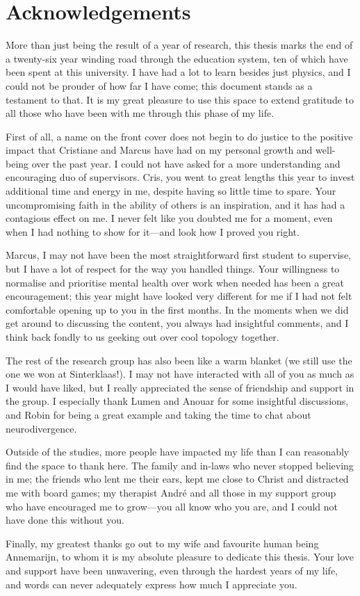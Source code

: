 \chapter*{Acknowledgements}

More than just being the result of a year of research, this thesis marks the end of a twenty-six year winding road through the education system, ten of which have been spent at this university. I have had a lot to learn besides just physics, and I could not be prouder of how far I have come; this document stands as a testament to that. It is my great pleasure to use this space to extend gratitude to all those who have been with me through this phase of my life.

First of all, a name on the front cover does not begin to do justice to the positive impact that Cristiane and Marcus have had on my personal growth and well-being over the past year. I could not have asked for a more understanding and encouraging duo of supervisors. Cris, you went to great lengths this year to invest additional time and energy in me, despite having so little time to spare. Your uncompromising faith in the ability of others is an inspiration, and it has had a contagious effect on me. I never felt like you doubted me for a moment, even when I had nothing to show for it---and look how I proved you right. 

Marcus, I may not have been the most straightforward first student to supervise, but I have a lot of respect for the way you handled things. Your willingness to normalise and prioritise mental health over work when needed has been a great encouragement; this year might have looked very different for me if I had not felt comfortable opening up to you in the first months. In the moments when we did get around to discussing the content, you always had insightful comments, and I think back fondly to us geeking out over cool topology together.

The rest of the research group has also been like a warm blanket (we still use the one we won at Sinterklaas!). I may not have interacted with all of you as much as I would have liked, but I really appreciated the sense of friendship and support in the group. I especially thank Lumen and Anouar for some insightful discussions, and Robin for being a great example and taking the time to chat about neurodivergence.

Outside of the studies, more people have impacted my life than I can reasonably find the space to thank here. The family and in-laws who never stopped believing in me; the friends who lent me their ears, kept me close to Christ and distracted me with board games; my therapist André and all those in my support group who have encouraged me to grow---you all know who you are, and I could not have done this without you.

Finally, my greatest thanks go out to my wife and favourite human being \mbox{Annemarijn}, to whom it is my absolute pleasure to dedicate this thesis. Your love and support have been unwavering, even through the hardest years of my life, and words can never adequately express how much I appreciate you.